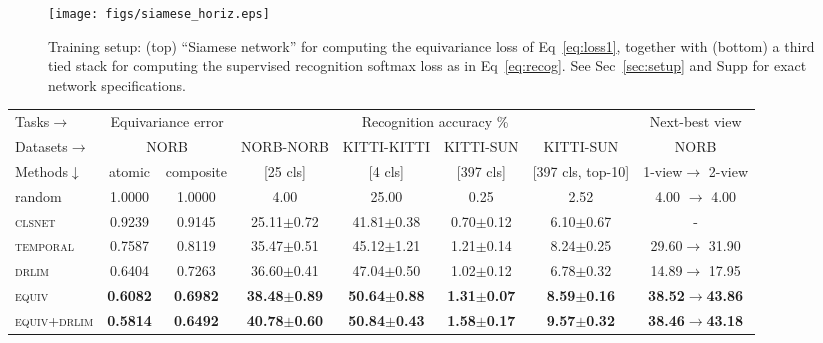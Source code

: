 \documentclass[10pt,twocolumn,letterpaper]{article}
\begin{document}
\begin{figure}[t]
  \centering
  \texttt{[image: figs/siamese\_horiz.eps]}
  \caption{Training setup: (top) ``Siamese network'' for computing the equivariance loss of Eq~\eqref{eq:loss1}, together with (bottom) a third tied stack for computing the supervised recognition softmax loss as in Eq~\eqref{eq:recog}.  See Sec~\ref{sec:setup} and Supp for exact network specifications.
}
\vspace{-0.05in}
  \label{fig:siamese}
\end{figure}%
  \centering
    \small{
    \begin{tabular}{|l|cc|cccc|c|}
    \hline
    Tasks$\rightarrow$ & \multicolumn{2}{c|}{Equivariance error} &  \multicolumn{4}{c|}{Recognition accuracy \%} & {Next-best view} \\
    Datasets$\rightarrow$         &  \multicolumn{2}{c|}{NORB}  &  NORB-NORB     &  KITTI-KITTI   & KITTI-SUN & KITTI-SUN  & {NORB} \\
    Methods$\downarrow$          & atomic       &  composite &   [25 cls]    &  [4 cls]       & [397 cls] & [397 cls, top-10]& 1-view$\rightarrow$ 2-view \\ \hline
    random           & 1.0000       & 1.0000     &   4.00        &   25.00        &   0.25    &   2.52    & 4.00 $\rightarrow$ 4.00 \\
    \textsc{clsnet}&0.9239 & 0.9145                         &25.11$\pm$0.72 & 41.81$\pm$0.38 & 0.70$\pm$0.12  & 6.10$\pm$0.67  & - \\
    \textsc{temporal}~\cite{Mobahi2009}&0.7587 & 0.8119     &35.47$\pm$0.51 & 45.12$\pm$1.21 & 1.21$\pm$0.14  & 8.24$\pm$0.25  & 29.60$\rightarrow$ 31.90 \\
    \textsc{drlim}~\cite{drlim}&0.6404 & 0.7263             &36.60$\pm$0.41 & 47.04$\pm$0.50 & 1.02$\pm$0.12  & 6.78$\pm$0.32  & 14.89$\rightarrow$  17.95 \\
    \textsc{equiv}& \textbf{0.6082} & \textbf{0.6982}                          &\textbf{38.48$\pm$0.89} & \textbf{50.64$\pm$0.88} & \textbf{1.31$\pm$0.07} & \textbf{8.59$\pm$0.16} & \textbf{38.52}\textbf{$\rightarrow$}\textbf{43.86}\\
    \textsc{equiv+drlim}& \textbf{0.5814} & \textbf{0.6492} &\textbf{40.78$\pm$0.60} &\textbf{50.84$\pm$0.43}  &\textbf{1.58$\pm$0.17} & \textbf{9.57$\pm$0.32} & \textbf{38.46}\textbf{$\rightarrow$}\textbf{43.18} \\ \hline
    \end{tabular}
}
\end{document}

